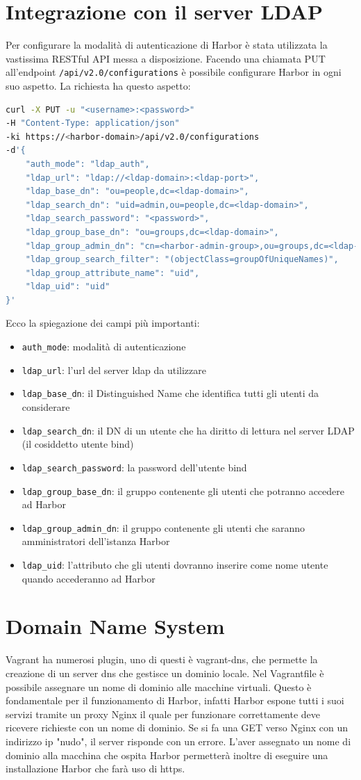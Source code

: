 \documentclass[12pt,a4paper]{report}
\begin{document}
\section{Integrazione con il server LDAP}
Per configurare la modalità di autenticazione di Harbor è stata utilizzata la vastissima RESTful API messa a disposizione. 
Facendo una chiamata PUT all'endpoint \texttt{/api/v2.0/configurations} è possibile configurare Harbor in ogni suo aspetto. La richiesta ha questo aspetto:
\begin{lstlisting}[language=bash]
curl -X PUT -u "<username>:<password>" 
-H "Content-Type: application/json" 
-ki https://<harbor-domain>/api/v2.0/configurations 
-d'{
    "auth_mode": "ldap_auth",
    "ldap_url": "ldap://<ldap-domain>:<ldap-port>",
    "ldap_base_dn": "ou=people,dc=<ldap-domain>",
    "ldap_search_dn": "uid=admin,ou=people,dc=<ldap-domain>",
    "ldap_search_password": "<password>",
    "ldap_group_base_dn": "ou=groups,dc=<ldap-domain>",
    "ldap_group_admin_dn": "cn=<harbor-admin-group>,ou=groups,dc=<ldap-domain>",
    "ldap_group_search_filter": "(objectClass=groupOfUniqueNames)",
    "ldap_group_attribute_name": "uid",
    "ldap_uid": "uid"
}'
\end{lstlisting}
Ecco la spiegazione dei campi più importanti:
\begin{itemize}
    \item \texttt{auth\_mode}: modalità di autenticazione
    \item \texttt{ldap\_url}: l'url del server ldap da utilizzare
    \item \texttt{ldap\_base\_dn}: il Distinguished Name che identifica tutti gli utenti da considerare
    \item \texttt{ldap\_search\_dn}: il DN di un utente che ha diritto di lettura nel server LDAP (il cosiddetto utente bind)
    \item \texttt{ldap\_search\_password}: la password dell'utente bind
    \item \texttt{ldap\_group\_base\_dn}: il gruppo contenente gli utenti che potranno accedere ad Harbor
    \item \texttt{ldap\_group\_admin\_dn}: il gruppo contenente gli utenti che saranno amministratori dell'istanza Harbor
    \item \texttt{ldap\_uid}: l'attributo che gli utenti dovranno inserire come nome utente quando accederanno ad Harbor
\end{itemize}
\section{Domain Name System}
Vagrant ha numerosi plugin, uno di questi è vagrant-dns, che permette la creazione di un server dns che gestisce un dominio locale. Nel Vagrantfile è possibile assegnare un nome di dominio alle macchine virtuali. Questo è fondamentale per il funzionamento di Harbor, infatti Harbor espone tutti i suoi servizi tramite un proxy Nginx il quale per funzionare correttamente deve ricevere richieste con un nome di dominio. Se si fa una GET verso Nginx con un indirizzo ip "nudo", il server risponde con un errore.
L'aver assegnato un nome di dominio alla macchina che ospita Harbor permetterà inoltre di eseguire una installazione Harbor che farà uso di https.
\end{document}
